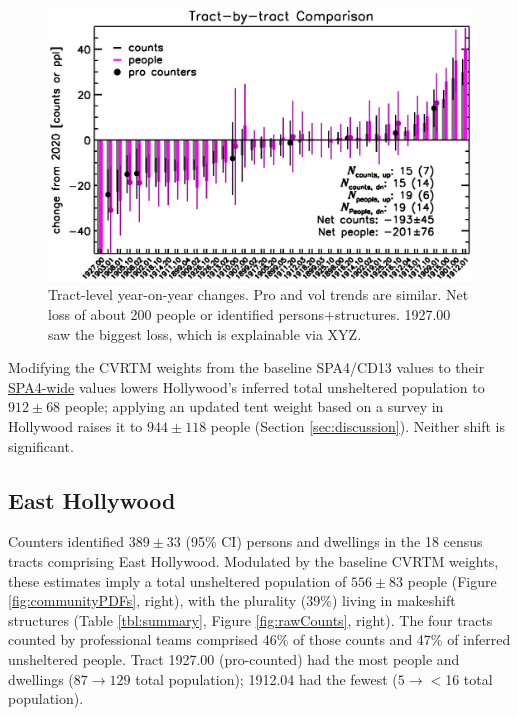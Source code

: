 \documentclass[11pt,twocolumn]{article}
\begin{document}
\begin{figure}[]
	\centering
	\includegraphics[width = 0.8\linewidth, trim = 0cm 0cm 0cm 0cm]{tractsYrYr}
	\caption{Tract-level year-on-year changes. Pro and vol trends are similar. Net loss of
			about 200 people or identified persons+structures. 1927.00 saw the biggest
			loss, which is explainable via XYZ.}
	\label{fig:tractYrYr}
\end{figure}

Modifying the CVRTM weights from the baseline SPA4/CD13 values to their 
\href{https://www.lahsa.org/documents?id=4693-2020-greater-los-angeles-homeless-count-cvrtm-conversion-factors}
{SPA4-wide} values lowers Hollywood's inferred total unsheltered population to $912\pm68$ people; applying
an updated tent weight based on a survey in Hollywood raises it to $944\pm118$ people (Section
\ref{sec:discussion}). Neither shift is significant.

\subsection{East Hollywood}
\label{sec:eHo}

Counters identified $389\pm33$ (95\% CI) persons and dwellings in the 18 census tracts 
comprising East Hollywood. Modulated by the baseline CVRTM weights, these estimates imply 
a total unsheltered population of $556\pm83$ people (Figure \ref{fig:communityPDFs},
right), with the plurality (39\%) living in makeshift structures (Table \ref{tbl:summary}, 
Figure \ref{fig:rawCounts}, right). The four tracts counted by professional teams comprised 46\% of 
those counts and 47\% of inferred unsheltered people. Tract 1927.00 (pro-counted) had the 
most people and dwellings ($87\rightarrow129$ total population); 1912.04 had the fewest 
($5\rightarrow$$<$16 total population). 
\end{document}
